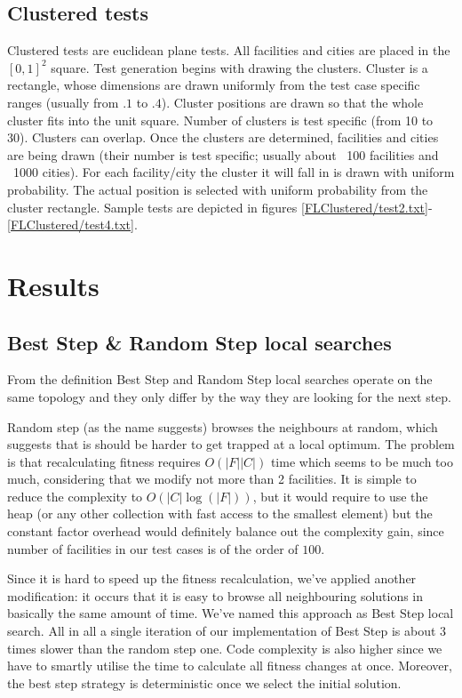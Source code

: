 \subsection{Clustered tests}
\FloatBarrier
Clustered tests are euclidean plane tests.
All facilities and cities are placed in the $[0,1]^2$ square.
Test generation begins with drawing the clusters.
Cluster is a rectangle, whose dimensions are drawn uniformly from the test case specific ranges (usually from $.1$ to $.4$).
Cluster positions are drawn so that the whole cluster fits into the unit square.
Number of clusters is test specific (from 10 to 30). Clusters can overlap.
Once the clusters are determined, facilities and cities are being drawn (their number is test specific; usually about ~100 facilities and ~1000 cities).
For each facility/city the cluster it will fall in is drawn with uniform probability.
The actual position is selected with uniform probability from the cluster rectangle.
Sample tests are depicted in figures \ref{FLClustered/test2.txt}-\ref{FLClustered/test4.txt}.




\FloatBarrier

\section{Results}

\subsection{Best Step \& Random Step local searches}

From the definition
Best Step and Random Step local searches operate on the same topology and
they only differ by the way they are looking for the next step.

Random step (as the name suggests) browses the neighbours at random,
which suggests that is should be harder to get trapped at a local optimum.
The problem is that recalculating fitness requires $O(|F||C|)$ time which
seems to be much too much, considering that we modify not more than 2 
facilities. It is simple to reduce the complexity to $O(|C|\log(|F|))$,
but it would require to use the heap (or any other collection with fast access
to the smallest element) but the constant factor overhead would definitely
balance out the complexity gain, since number of facilities in our test
cases is of the order of $100$.

Since it is hard to speed up the fitness recalculation, we've applied
another modification: it occurs that it is easy to browse all neighbouring
solutions in basically the same amount of time. We've named this approach
as Best Step local search. All in all a single iteration of our implementation
of Best Step is about 3 times slower than the random step one.
Code complexity is also higher since we have to smartly utilise the
time to calculate all fitness changes at once.
Moreover, the best step strategy is deterministic once we select the initial
solution.

